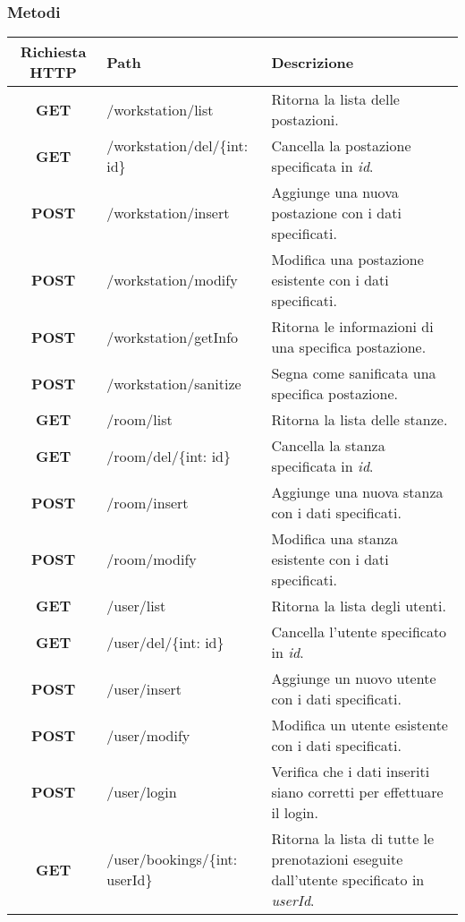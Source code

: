 \subsubsection{Metodi}
\begin{center}
	\begin{longtable}{|c|p{5cm}|p{5cm}|}
		\hline
		\rowcolor{lighter-grayer}
		\textbf{Richiesta HTTP} & \textbf{Path} & \textbf{Descrizione}\\		
		\hline
		\endfirsthead
		\textbf{GET} & /workstation/list & Ritorna la lista delle postazioni.\\
		\hline
		\textbf{GET} & /workstation/del/\{int: id\} & Cancella la postazione specificata in \textit{id}.\\
		\hline
		\textbf{POST} & /workstation/insert & Aggiunge una nuova postazione con i dati specificati.\\
		\hline
		\textbf{POST} & /workstation/modify & Modifica una postazione esistente con i dati specificati.\\
		\hline
		\textbf{POST} & /workstation/getInfo & Ritorna le informazioni di una specifica postazione.\\
		\hline
		\textbf{POST} & /workstation/sanitize & Segna come sanificata una specifica postazione.\\
		\hline
		\textbf{GET} & /room/list & Ritorna la lista delle stanze.\\
		\hline
		\textbf{GET} & /room/del/\{int: id\} & Cancella la stanza specificata in \textit{id}.\\
		\hline
		\textbf{POST} & /room/insert & Aggiunge una nuova stanza con i dati specificati.\\
		\hline
		\textbf{POST} & /room/modify & Modifica una stanza esistente con i dati specificati.\\
		\hline
		\textbf{GET} & /user/list & Ritorna la lista degli utenti.\\
		\hline
		\textbf{GET} & /user/del/\{int: id\} & Cancella l'utente specificato in \textit{id}.\\
		\hline
		\textbf{POST} & /user/insert & Aggiunge un nuovo utente con i dati specificati.\\
		\hline
		\textbf{POST} & /user/modify & Modifica un utente esistente con i dati specificati.\\
		\hline
		\textbf{POST} & /user/login & Verifica che i dati inseriti siano corretti per effettuare il login.\\
		\hline
		\textbf{GET} & /user/bookings/\{int: userId\} & Ritorna la lista di tutte le prenotazioni eseguite dall'utente specificato in \textit{userId}.\\
		\hline
	\end{longtable}
\end{center}
